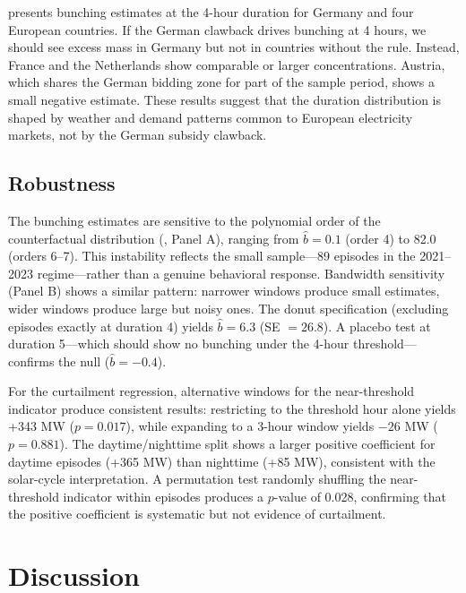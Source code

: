 \documentclass[12pt]{article}
\begin{document}
 presents bunching estimates at the 4-hour duration for Germany and four European countries. If the German clawback drives bunching at 4 hours, we should see excess mass in Germany but not in countries without the rule. Instead, France and the Netherlands show comparable or larger concentrations. Austria, which shares the German bidding zone for part of the sample period, shows a small negative estimate. These results suggest that the duration distribution is shaped by weather and demand patterns common to European electricity markets, not by the German subsidy clawback.



\subsection{Robustness}

The bunching estimates are sensitive to the polynomial order of the counterfactual distribution (, Panel A), ranging from $\hat{b} = 0.1$ (order 4) to 82.0 (orders 6--7). This instability reflects the small sample---89 episodes in the 2021--2023 regime---rather than a genuine behavioral response. Bandwidth sensitivity (Panel B) shows a similar pattern: narrower windows produce small estimates, wider windows produce large but noisy ones. The donut specification (excluding episodes exactly at duration 4) yields $\hat{b} = 6.3$ (SE $= 26.8$). A placebo test at duration 5---which should show no bunching under the 4-hour threshold---confirms the null ($\hat{b} = -0.4$).

For the curtailment regression, alternative windows for the near-threshold indicator produce consistent results: restricting to the threshold hour alone yields +343 MW ($p = 0.017$), while expanding to a 3-hour window yields $-26$ MW ($p = 0.881$). The daytime/nighttime split shows a larger positive coefficient for daytime episodes (+365 MW) than nighttime (+85 MW), consistent with the solar-cycle interpretation. A permutation test randomly shuffling the near-threshold indicator within episodes produces a $p$-value of 0.028, confirming that the positive coefficient is systematic but not evidence of curtailment.




\section{Discussion}
\label{sec:discussion}
\end{document}
